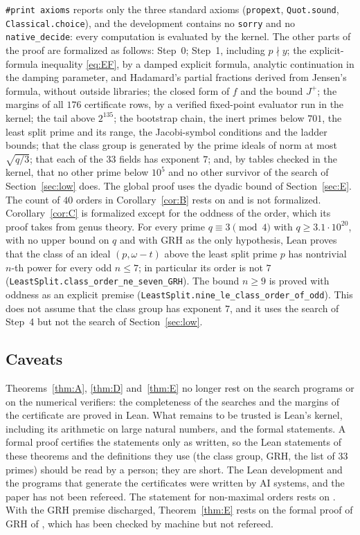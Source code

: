 \documentclass[11pt]{amsart}
\theoremstyle{remark}
\begin{document}
\texttt{\#print axioms} reports only the three standard axioms (\texttt{propext}, \texttt{Quot.sound}, \texttt{Classical.\allowbreak choice}), and the development contains no \texttt{sorry} and no \texttt{native\_decide}: every computation is evaluated by the kernel. The other parts of the proof are formalized as follows: Step~0; Step~1, including $p\nmid y$; the explicit-formula inequality \eqref{eq:EF}, by a damped explicit formula, analytic continuation in the damping parameter, and Hadamard's partial fractions derived from Jensen's formula, without outside libraries; the closed form of $f$ and the bound $J^+$; the margins of all $176$ certificate rows, by a verified fixed-point evaluator run in the kernel; the tail above $2^{135}$; the bootstrap chain, the inert primes below $701$, the least split prime and its range, the Jacobi-symbol conditions and the ladder bounds; that the class group is generated by the prime ideals of norm at most $\sqrt{q/3}$; that each of the $33$ fields has exponent $7$; and, by tables checked in the kernel, that no other prime below $10^5$ and no other survivor of the search of Section~\ref{sec:low} does. The global proof uses the dyadic bound of Section~\ref{sec:E}. The count of $40$ orders in Corollary~\ref{cor:B} rests on \cite{ARSX} and is not formalized. Corollary~\ref{cor:C} is formalized except for the oddness of the order, which its proof takes from genus theory. For every prime $q\equiv3\pmod4$ with $q\ge3.1\cdot10^{20}$, with no upper bound on $q$ and with GRH as the only hypothesis, Lean proves that the class of an ideal $(p,\omega-t)$ above the least split prime $p$ has nontrivial $n$-th power for every odd $n\le7$; in particular its order is not $7$ (\texttt{LeastSplit.\allowbreak class\_\allowbreak order\_\allowbreak ne\_\allowbreak seven\_\allowbreak GRH}). The bound $n\ge9$ is proved with oddness as an explicit premise (\texttt{LeastSplit.\allowbreak nine\_\allowbreak le\_\allowbreak class\_\allowbreak order\_\allowbreak of\_\allowbreak odd}). This does not assume that the class group has exponent $7$, and it uses the search of Step~4 but not the search of Section~\ref{sec:low}.

\subsection*{Caveats}
Theorems~\ref{thm:A}, \ref{thm:D} and~\ref{thm:E} no longer rest on the search programs or on the numerical verifiers: the completeness of the searches and the margins of the certificate are proved in Lean. What remains to be trusted is Lean's kernel, including its arithmetic on large natural numbers, and the formal statements. A formal proof certifies the statements only as written, so the Lean statements of these theorems and the definitions they use (the class group, GRH, the list of $33$ primes) should be read by a person; they are short. The Lean development and the programs that generate the certificates were written by AI systems, and the paper has not been refereed. The statement for non-maximal orders rests on \cite{ARSX}. With the GRH premise discharged, Theorem~\ref{thm:E} rests on the formal proof of GRH of \cite{GRH}, which has been checked by machine but not refereed.
\end{document}
